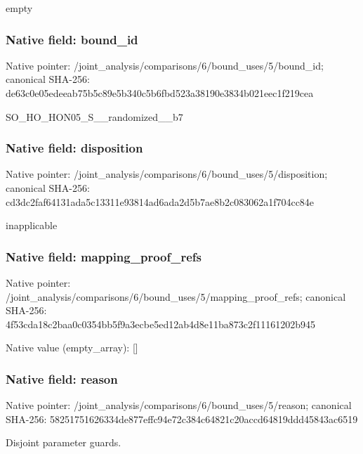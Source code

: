 \documentclass[10pt,a4paper]{article}
\begin{document}
\begingroup\raggedright\sloppy empty\par\endgroup

\subsubsection{Native field: bound\_\allowbreak{}id}
Native pointer: /joint\_\allowbreak{}analysis/comparisons/6/bound\_\allowbreak{}uses/5/bound\_\allowbreak{}id; canonical SHA-256: de63c0e05edeeab75b5c89e5b340c5b6fbd523a38190e3834b021eec1f219cea

\begingroup\raggedright\sloppy SO\_\allowbreak{}HO\_\allowbreak{}HON05\_\allowbreak{}S\_\allowbreak{}\_\allowbreak{}randomized\_\allowbreak{}\_\allowbreak{}b7\par\endgroup

\subsubsection{Native field: disposition}
Native pointer: /joint\_\allowbreak{}analysis/comparisons/6/bound\_\allowbreak{}uses/5/disposition; canonical SHA-256: cd3dc2faf64131ada5c13311e93814ad6ada2d5b7ae8b2c083062a1f704cc84e

\begingroup\raggedright\sloppy inapplicable\par\endgroup

\subsubsection{Native field: mapping\_\allowbreak{}proof\_\allowbreak{}refs}
Native pointer: /joint\_\allowbreak{}analysis/comparisons/6/bound\_\allowbreak{}uses/5/mapping\_\allowbreak{}proof\_\allowbreak{}refs; canonical SHA-256: 4f53cda18c2baa0c0354bb5f9a3ecbe5ed12ab4d8e11ba873c2f11161202b945

Native value (empty\_\allowbreak{}array): []

\subsubsection{Native field: reason}
Native pointer: /joint\_\allowbreak{}analysis/comparisons/6/bound\_\allowbreak{}uses/5/reason; canonical SHA-256: 58251751626334de877effc94e72c384c64821c20accd64819ddd45843ac6519

\begingroup\raggedright\sloppy Disjoint parameter guards.\par\endgroup
\end{document}
